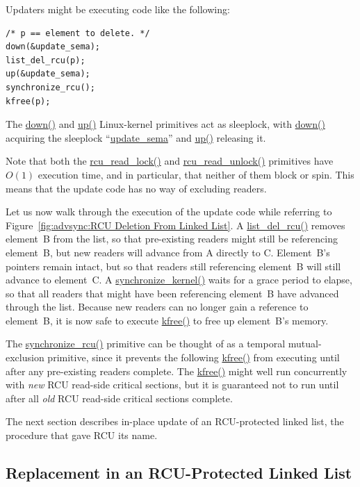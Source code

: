 Updaters might be executing code like the following:

\vspace{5pt}
\begin{minipage}[t]{\columnwidth}
\begin{verbatim}
/* p == element to delete. */
down(&update_sema);
list_del_rcu(p);
up(&update_sema);
synchronize_rcu();
kfree(p);
\end{verbatim}
\end{minipage}
\vspace{5pt}

The \url{down()} and \url{up()} Linux-kernel primitives act as sleeplock,
with \url{down()} acquiring the sleeplock ``\url{update_sema}''
and \url{up()} releasing it.

Note that both the \url{rcu_read_lock()} and \url{rcu_read_unlock()}
primitives have $O(1)$ execution time, and in particular, that
neither of them block or spin.
This means that the update code has no way of excluding readers.

Let us now walk through the execution of the update code
while referring to
Figure~\ref{fig:advsync:RCU Deletion From Linked List}.
A \url{list_del_rcu()} removes element~B from the list, so that
pre-existing readers might still be referencing
element~B, but new readers will advance from A directly to C.
Element~B's pointers remain intact, but so that readers still
referencing element~B will still advance to element~C.
A \url{synchronize_kernel()} waits for a grace period to elapse,
so that all readers that might have been referencing element~B have
advanced through the list.
Because new readers can no longer gain a reference to element~B,
it is now safe to execute \url{kfree()} to free up element~B's memory.

The \url{synchronize_rcu()} primitive can be thought of as a temporal
mutual-exclusion primitive, since it prevents the following \url{kfree()}
from executing until after any pre-existing readers complete.
The \url{kfree()} might well run concurrently with \emph{new}
RCU read-side critical sections, but it is guaranteed not to run
until after all \emph{old} RCU read-side critical sections complete.

The next section describes in-place update of an RCU-protected
linked list, the procedure that gave RCU its name.

\subsection{Replacement in an RCU-Protected Linked List}
\label{sec:advsync:Replacement in an RCU-Protected Linked List}

